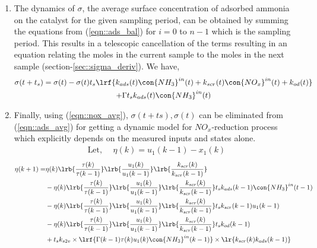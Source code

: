 \begin{enumerate}
        \item The dynamics of $\sigma$, the average surface concentration of adsorbed ammonia on the catalyst for the given sampling period, can be obtained by summing the equations from (\ref{eqn::ads_bal}) for $i = 0$ to $n-1$ which is the sampling period. This results in a telescopic cancellation of the terms resulting in an equation relating the moles in the current sample to the moles in the next sample (section-\ref{sec::sigma_deriv}). We have,
                \begin{multline}
                        \sigma(t + t_s) = \sigma(t) - \sigma(t) t_s \lrf{k_{ads}(t) \con{NH_3}^{in}(t)
                                                                                + k_{scr}(t) \con{NO_x}^{in}(t)
                                                                                + k_{od}(t)}
                                                \\
                                                + \Gamma t_s k_{ads}(t) \con{NH_3}^{in}(t)
                        \label{eqn::ads_avg}
                \end{multline}
        \item Finally, using (\ref{eqn::nox_avg}), $\sigma(t+ts), \sigma(t)$ can be eliminated from (\ref{eqn::ads_avg}) for getting a dynamic model for $NO_x$-reduction process which explicitly depends on the measured inputs and states alone.
                \begin{align}
                        \text{Let, }\quad \eta(k) = u_1(k-1) - x_1(k)
                \end{align}
\begin{align*}
        \eta(k+1) =& \eta(k) \lrb{\frac{\tau(k)}{\tau(k-1)}}
                                \lrb{\frac{u_1(k)}{u_1(k-1)}}
                                \lrb{\frac{k_{scr}(k)}{k_{scr}(k-1)}} \\
                &-\eta(k) \lrb{\frac{\tau(k)}{\tau(k-1)}}
                                \lrb{\frac{u_1(k)}{u_1(k-1)}}
                                \lrb{\frac{k_{scr}(k)}{k_{scr}(k-1)}}
                t_s k_{ads}(k-1) \con{NH_3}^{in}(t-1)
                \\
                &-\eta(k) \lrb{\frac{\tau(k)}{\tau(k-1)}}
                                \lrb{\frac{u_1(k)}{u_1(k-1)}}
                                \lrb{\frac{k_{scr}(k)}{k_{scr}(k-1)}}
                t_s k_{scr}(k-1) u_1(k-1)
                \\
                &-\eta(k) \lrb{\frac{\tau(k)}{\tau(k-1)}}
                                \lrb{\frac{u_1(k)}{u_1(k-1)}}
                                \lrb{\frac{k_{scr}(k)}{k_{scr}(k-1)}}
                t_s k_{od}(k-1)
                \\
                &+ t_s k_{s2v} \times \lrf{\Gamma(k-1) \tau(k) u_1(k) \con{NH_3}^{in}(k-1)} \times \lr{k_{scr}(k) k_{ads}(k-1)}
\end{align*}
\begin{equation}
                \label{eqn::disc_NOx}
\end{equation}

\end{enumerate}

